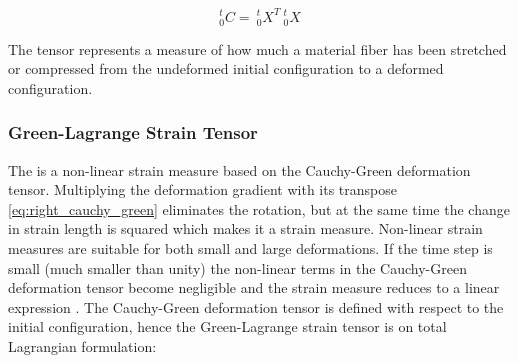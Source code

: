 \begin{equation}
\label{eq:right_cauchy_green}
^t_0C = \ ^t_0X^T \ ^t_0X
\end{equation}

The tensor represents a measure of how much a material fiber has been
stretched or compressed from the undeformed initial configuration to
a deformed configuration. 


\subsubsection*{Green-Lagrange Strain Tensor}
\label{sec:green_lagrange_strain_tensor}

The  is a non-linear strain
measure based on the Cauchy-Green deformation tensor.
Multiplying the deformation gradient with its transpose
\eqref{eq:right_cauchy_green} eliminates the rotation, but at the 
same time the change in strain length is squared which makes it a
 strain measure. Non-linear strain measures are suitable
for both small and large deformations. If the time step is small (much
smaller than unity) the non-linear terms in the Cauchy-Green
deformation tensor become negligible and the strain measure reduces
to a linear expression .
The Cauchy-Green deformation tensor is defined with respect to the
initial configuration, hence the Green-Lagrange strain tensor is on
total Lagrangian formulation:   

